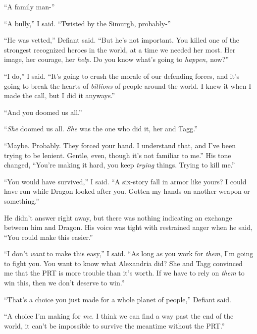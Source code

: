 ``A family man-''



``A bully,'' I said.  ``Twisted by the Simurgh, probably-''



``He was vetted,'' Defiant said.  ``But he's not important.  You killed one of the strongest recognized heroes in the world, at a time we needed her most.  Her image, her courage, her \emph{help}.  Do you know what's going to \emph{happen, }now?''



``I do,'' I said.  ``It's going to crush the morale of our defending forces, and it's going to break the hearts of \emph{billions} of people around the world.  I knew it when I made the call, but I did it anyways.''



``And you doomed us all.''



``\emph{She} doomed us all.  \emph{She }was the one who did it, her and Tagg.''



``Maybe.  Probably.  They forced your hand.  I understand that, and I've been trying to be lenient.  Gentle, even, though it's not familiar to me.''  His tone changed, ``You're making it hard, you keep \emph{trying} things.  Trying to kill me.''



``You would have survived,'' I said.  ``A six-story fall in armor like yours?  I could have run while Dragon looked after you.  Gotten my hands on another weapon or something.''



He didn't answer right away, but there was nothing indicating an exchange between him and Dragon.  His voice was tight with restrained anger when he said, ``You could make this easier.''



``I don't \emph{want }to make this easy,'' I said.  ``As long as you work for \emph{them}, I'm going to fight you.  You want to know what Alexandria did?  She and Tagg convinced me that the PRT is more trouble than it's worth.  If we have to rely on \emph{them} to win this, then we don't deserve to win.''



``That's a choice you just made for a whole planet of people,'' Defiant said.



``A choice I'm making for \emph{me}.  I think we can find a way past the end of the world, it can't be impossible to survive the meantime without the PRT.''



